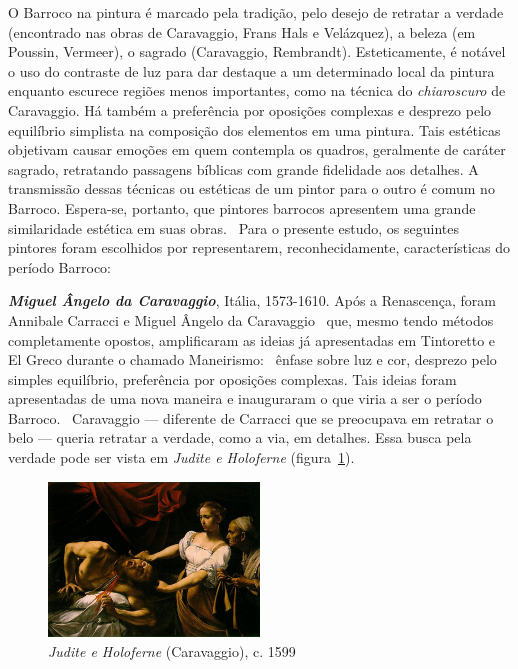 O Barroco na pintura é marcado pela tradição, pelo desejo de retratar
a verdade (encontrado nas obras de Caravaggio, Frans Hals e
Velázquez), a beleza (em Poussin, Vermeer), o sagrado (Caravaggio,
Rembrandt). Esteticamente, é notável o uso do contraste de luz para
dar destaque a um determinado local da pintura enquanto escurece
regiões menos importantes, como na técnica do \textit{chiaroscuro}
de Caravaggio. Há também a preferência por oposições complexas e
desprezo pelo equilíbrio simplista na composição dos elementos em uma
pintura. Tais estéticas objetivam causar emoções em quem contempla os
quadros, geralmente de caráter sagrado, retratando passagens bíblicas
com grande fidelidade aos detalhes. A transmissão dessas técnicas ou
estéticas de um pintor para o outro é comum no Barroco. Espera-se,
portanto, que pintores barrocos apresentem uma grande similaridade
estética em suas obras.~\cite{gombrich,hills,gardner} Para o presente
estudo, os seguintes pintores foram escolhidos por representarem,
reconhecidamente, características do período Barroco:

\textbf{\emph{Miguel Ângelo da Caravaggio}}, Itália, 1573-1610.  Após
a Renascença, foram Annibale Carracci e Miguel Ângelo da
Caravaggio~\cite{bayer} que, mesmo tendo métodos completamente
opostos, amplificaram as ideias já apresentadas em Tintoretto e El
Greco durante o chamado Maneirismo:~\cite{tatarkiewicz} ênfase sobre
luz e cor, desprezo pelo simples equilíbrio, preferência por oposições
complexas. Tais ideias foram apresentadas de uma nova maneira e
inauguraram o que viria a ser o período Barroco.~\cite{hills}
Caravaggio --- diferente de Carracci que se preocupava em retratar o
belo --- queria retratar a verdade, como a via, em detalhes. Essa
busca pela verdade pode ser vista em
\emph{Judite e Holoferne} (figura~\ref{fig:caravaggio:judite}).~\cite{puglisi,caravaggio} 

\begin{figure}
  \vspace{-15pt}
  \begin{centering}
    \caption{\emph{Judite e Holoferne} (Caravaggio), c. 1599}
    \label{fig:caravaggio:judite}
    \includegraphics[width=0.5\textwidth]{figs/caravaggio_judite.png}
  \end{centering}
\end{figure}

